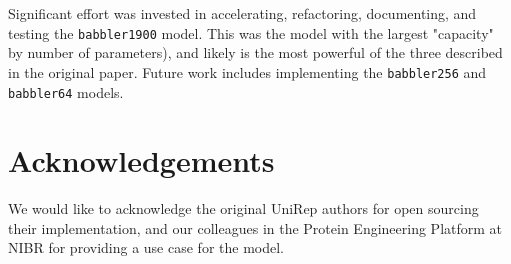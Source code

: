\documentclass{bioinfo}
\begin{document}
Significant effort was invested in
accelerating, refactoring, documenting,
and testing the \verb|babbler1900| model.
This was the model with the largest "capacity" by number of parameters),
and likely is the most powerful of the three described in the original paper.
Future work includes implementing
the \verb|babbler256| and \verb|babbler64| models.

\section{Acknowledgements}

We would like to acknowledge the original UniRep authors
for open sourcing their implementation,
and our colleagues in the Protein Engineering Platform at NIBR
for providing a use case for the model.



\end{document}
